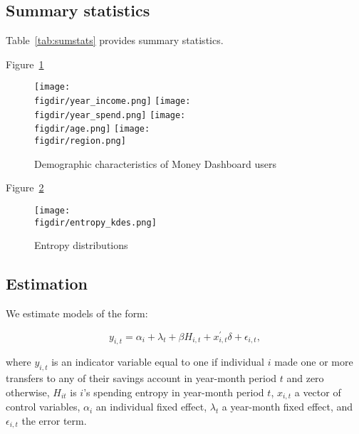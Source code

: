 \subsection{Summary statistics}%
\label{par:summary_statistics}

Table~\ref{tab:sumstats} provides summary statistics.


Figure~\ref{fig:sample_desc}
\begin{figure}[h]
    \centering
    \caption{Demographic characteristics of Money Dashboard users}
    \label{fig:sample_desc}
    \texttt{[image: \\figdir/year\_income.png]}
    \texttt{[image: \\figdir/year\_spend.png]}
    \texttt{[image: \\figdir/age.png]}
    \texttt{[image: \\figdir/region.png]}
\end{figure}

Figure~\ref{fig:entropy_kdes}
\begin{figure}[h]
    \center \newcommand\width{\textwidth} \caption{Entropy distributions}
    \label{fig:entropy_kdes}
    \texttt{[image: \\figdir/entropy\_kdes.png]}
    \fignote{\width}{}
\end{figure}


\subsection{Estimation}%
\label{sub:estimation}

We estimate models of the form: 

\begin{equation}
    y_{i,t} = \alpha_i + \lambda_t + \beta H_{i,t} + x^\prime_{i,t} \delta +
    \epsilon_{i,t},
\end{equation}

\noindent where $y_{i,t}$ is an indicator variable equal to one if individual $i$ made
one or more transfers to any of their savings account in year-month period $t$ and zero
otherwise, $H_{it}$ is $i$'s spending entropy in year-month period $t$, $x_{i,t}$ a vector
of control variables, $\alpha_i$ an individual fixed effect, $\lambda_t$ a
year-month fixed effect, and $\epsilon_{i, t}$ the error term.

